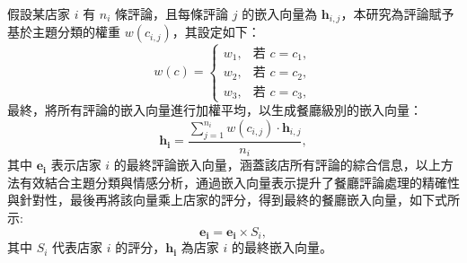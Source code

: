         假設某店家 \(i\) 有 \(n_i\) 條評論，且每條評論 \(j\) 的嵌入向量為 \(\mathbf{h}_{i,j}\)，本研究為評論賦予基於主題分類的權重 \(w(c_{i,j})\)，其設定如下：
        \begin{equation}
            w(c) =
            \begin{cases}
            w_{1}, & \text{若 } c = c_1, \\
            w_{2}, & \text{若 } c = c_2, \\
            w_{3}, & \text{若 } c = c_3,
            \end{cases}
        \end{equation}
        最終，將所有評論的嵌入向量進行加權平均，以生成餐廳級別的嵌入向量：
        \begin{equation}
            \mathbf{h_i} = \frac{\sum_{j=1}^{n_i} w(c_{i,j}) \cdot \mathbf{h}_{i,j}}{n_i},
        \end{equation}
        其中 \(\mathbf{e_i}\) 表示店家 \(i\) 的最終評論嵌入向量，涵蓋該店所有評論的綜合信息，以上方法有效結合主題分類與情感分析，通過嵌入向量表示提升了餐廳評論處理的精確性與針對性，最後再將該向量乘上店家的評分，得到最終的餐廳嵌入向量，如下式所示:
        \begin{equation}
            \mathbf{e_i} = \mathbf{e_i} \times S_i,
        \end{equation}
        其中 \(S_i\) 代表店家 \(i\) 的評分，\(\mathbf{h_i}\) 為店家 \(i\) 的最終嵌入向量。
        


